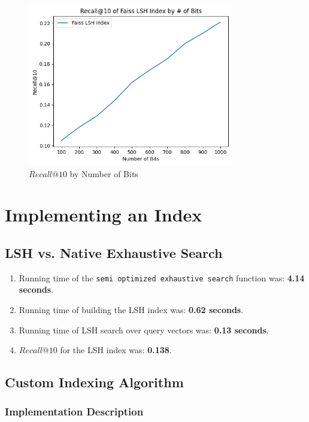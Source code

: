 \documentclass[12pt]{article}
\begin{document}
\begin{figure}[H]
    \centering
    \includegraphics[width=0.8\textwidth]{images/1_2_3.png}
    \caption{$Recall@10$ by Number of Bits}
\end{figure}

\newpage

\section{Implementing an Index}

\subsection{LSH vs. Native Exhaustive Search}

\begin{enumerate}
    \item Running time of the \texttt{semi optimized exhaustive search} function was: \textbf{4.14 seconds}.
    \item Running time of building the LSH index was: \textbf{0.62 seconds}.
    \item Running time of LSH search over query vectors was: \textbf{0.13 seconds}.
    \item $Recall@10$ for the LSH index was: \textbf{0.138}.
\end{enumerate}

\subsection{Custom Indexing Algorithm}

\subsubsection*{Implementation Description}
\end{document}
